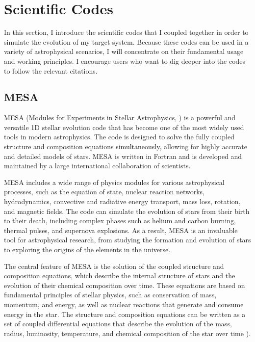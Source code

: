 \section{Scientific Codes}\label{sec:scientific_codes}

In this section, I introduce the scientific codes that I coupled together in order to simulate the evolution of my target system.  Because these codes can be used in a variety of astrophysical scenarios, I will concentrate on their fundamental usage and working principles. I encourage users who want to dig deeper into the codes to follow the relevant citations.

\subsection{MESA}

MESA (Modules for Experiments in Stellar Astrophysics, \cite{paxton2010modules,paxton2013modules,paxton2015modules,paxton2019modules}) is a powerful and versatile 1D stellar evolution code that has become one of the most widely used tools in modern astrophysics. The code is designed to solve the fully coupled structure and composition equations simultaneously, allowing for highly accurate and detailed models of stars. MESA is written in Fortran and is developed and maintained by a large international collaboration of scientists.

MESA includes a wide range of physics modules for various astrophysical processes, such as the equation of state, nuclear reaction networks, hydrodynamics, convective and radiative energy transport, mass loss, rotation, and magnetic fields. The code can simulate the evolution of stars from their birth to their death, including complex phases such as helium and carbon burning, thermal pulses, and supernova explosions. As a result, MESA is an invaluable tool for astrophysical research, from studying the formation and evolution of stars to exploring the origins of the elements in the universe.

The central feature of MESA is the solution of the coupled structure and composition equations, which describe the internal structure of stars and the evolution of their chemical composition over time. These equations are based on fundamental principles of stellar physics, such as conservation of mass, momentum, and energy, as well as nuclear reactions that generate and consume energy in the star. The structure and composition equations can be written as a set of coupled differential equations that describe the evolution of the mass, radius, luminosity, temperature, and chemical composition of the star over time \citep{paxton2010modules,paxton2013modules,paxton2015modules,paxton2019modules}).

